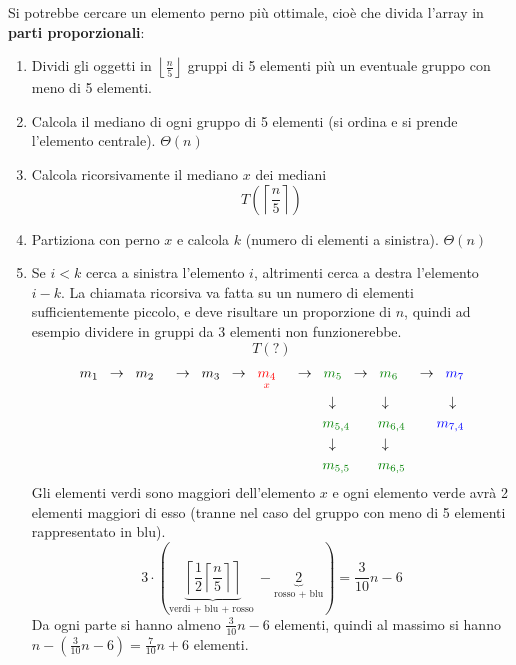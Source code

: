 \documentclass[a4paper]{article}
\begin{document}
Si potrebbe cercare un elemento perno più ottimale, cioè che divida l'array in
\textbf{parti proporzionali}:
\begin{enumerate}
  \item Dividi gli oggetti in \( \left\lfloor \frac{n}{5} \right\rfloor \) gruppi di
    5 elementi più un eventuale gruppo con meno di 5 elementi.

  \item Calcola il mediano di ogni gruppo di 5 elementi (si ordina e si prende l'elemento
    centrale). \( \Theta(n) \)

  \item Calcola ricorsivamente il mediano \( x \) dei mediani
    \[
      T\left(\left\lceil \frac{n}{5} \right\rceil\right)
    \] 

  \item Partiziona con perno \( x \) e calcola \( k \) (numero di elementi a sinistra).
    \( \Theta (n) \) 

  \item Se \( i<k \) cerca a sinistra l'elemento \( i \), altrimenti cerca a destra
    l'elemento \( i-k \). La chiamata ricorsiva va fatta su un numero di elementi
    sufficientemente piccolo, e deve risultare un proporzione di \( n \), quindi
    ad esempio dividere in gruppi da 3 elementi non funzionerebbe.
    \[
    T(?)
    \] 
    \[
      \begin{aligned}
        m_1 \;\;&\to\;\; m_2 \;\;&\to\;\; m_3 \;\;&\to\;\; \color{red}\underset{x}{m_4} \;\;&\to\;\; \color{green!50!black}m_5
        \;\;&\to\;\; \color{green!50!black}m_6 \;\;&\to\;\; \color{blue}m_7\\
             &&&& \downarrow \quad&\qquad \downarrow &\downarrow \;\;\\
             &&&& \color{green!50!black}m_{5,4} &\qquad \color{green!50!black}m_{6,4} & \color{blue}m_{7,4} \\
             &&&& \downarrow \quad&\qquad \downarrow &\\
             &&&& \color{green!50!black}m_{5,5} &\qquad \color{green!50!black}m_{6,5} & \\
      \end{aligned}
    \] 
    Gli elementi verdi sono maggiori dell'elemento \( x \) e ogni elemento verde avrà
    2 elementi maggiori di esso (tranne nel caso del gruppo con meno di 5 elementi
    rappresentato in blu).
    \[
      3 \cdot  \left(\underbrace{\left\lceil \frac{1}{2} \left\lceil \frac{n}{5} \right\rceil  \right\rceil}_{\text{
          verdi + blu + rosso
      }} - \underbrace{2}_{\text{rosso + blu}} \right) 
      = \frac{3}{10} n - 6
    \] 
    Da ogni parte si hanno almeno \( \frac{3}{10} n - 6 \) elementi, quindi
    al massimo si hanno \( n - \left( \frac{3}{10} n - 6 \right) = \frac{7}{10} n + 6 \)
    elementi.


\end{enumerate}
\end{document}
